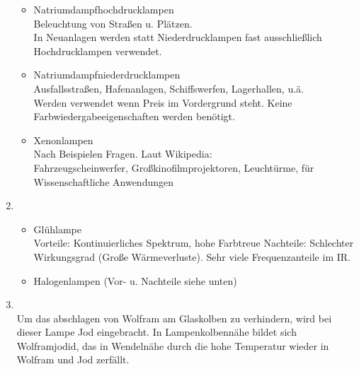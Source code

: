 \begin{enumerate}
            \begin{itemize}
                \item Natriumdampfhochdrucklampen\\
                    Beleuchtung von Straßen u. Plätzen. \\
                    In Neuanlagen werden statt Niederdrucklampen fast ausschließlich Hochdrucklampen verwendet.

                \item Natriumdampfniederdrucklampen\\
                    Ausfallsstraßen, Hafenanlagen, Schiffswerfen, Lagerhallen, u.ä.\\
                    Werden verwendet wenn Preis im Vordergrund steht. Keine Farbwiedergabeeigenschaften werden benötigt.

                \item Xenonlampen\\
                    Nach Beispielen Fragen. Laut Wikipedia:\\
                    Fahrzeugscheinwerfer, Großkinofilmprojektoren, Leuchtürme, für Wissenschaftliche Anwendungen
            \end{itemize}

    \item   {}\\
            
            \begin{itemize}
                \item Glühlampe\\
                    Vorteile: Kontinuierliches Spektrum, hohe Farbtreue
                    Nachteile: Schlechter Wirkungsgrad (Große Wärmeverluste). Sehr viele Frequenzanteile im IR.

                \item Halogenlampen (Vor- u. Nachteile siehe unten)
            \end{itemize}


    \item   {}\\
    
    Um das abschlagen von Wolfram am Glaskolben zu verhindern, wird bei dieser Lampe Jod eingebracht. In Lampenkolbennähe bildet
    sich Wolframjodid, das in Wendelnähe durch die hohe Temperatur wieder in Wolfram und
    Jod zerfällt.
    

\end{enumerate}
